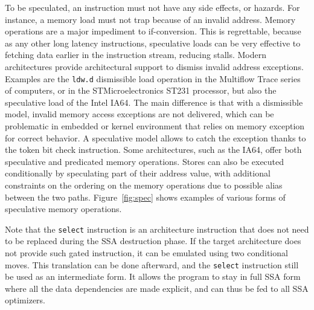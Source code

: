 To be speculated, an instruction must not have any side effects, or hazards. 
For instance, a memory load must not trap because of an invalid address. 
Memory operations are a major impediment to if-conversion. 
This is regrettable, because as any other long latency instructions, speculative loads can be very effective to fetching data earlier in the instruction stream, reducing stalls. 
Modern architectures provide architectural support to dismiss invalid address exceptions. 
Examples are the \texttt{ldw.d} dismissible load operation in the Multiflow Trace series of computers, or in the STMicroelectronics ST231 processor, but also the speculative load of the Intel IA64. 
The main difference is that with a dismissible model, invalid memory access exceptions are not delivered, which can be problematic in embedded or kernel environment that relies on memory exception for correct behavior. 
A speculative model allows to catch the exception thanks to the token bit check instruction. 
Some architectures, such as the IA64, offer both speculative and predicated memory operations. Stores can also be executed conditionally by speculating part of their address value, with additional constraints on the ordering on the memory operations due to possible alias between the two paths. 
Figure~\ref{fig:spec} shows examples of various forms of speculative memory operations.

Note that the \texttt{select} instruction is an architecture instruction that does not need to be replaced during the SSA destruction phase. 
If the target architecture does not provide such gated instruction, it can be emulated using two conditional moves. 
This translation can be done afterward, and the \texttt{select} instruction still be used as an intermediate form. 
It allows the program to stay in full SSA form where all the data dependencies are made explicit, and can thus be fed to all SSA optimizers.


